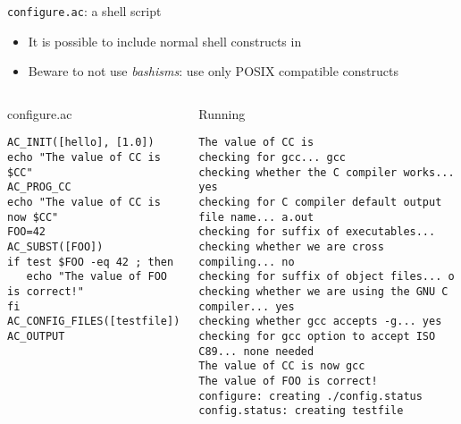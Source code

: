 \begin{frame}[fragile]{{\tt configure.ac}: a shell script}

\begin{itemize}
\item It is possible to include normal shell constructs in
\item Beware to not use {\em bashisms}: use only POSIX compatible
  constructs
\end{itemize}

\begin{columns}

\begin{block}{configure.ac}
{\tiny
\begin{verbatim}
AC_INIT([hello], [1.0])
echo "The value of CC is $CC"
AC_PROG_CC
echo "The value of CC is now $CC"
FOO=42
AC_SUBST([FOO])
if test $FOO -eq 42 ; then
   echo "The value of FOO is correct!"
fi
AC_CONFIG_FILES([testfile])
AC_OUTPUT
\end{verbatim}}
\end{block}


\begin{block}{Running }
\begin{verbatim}
The value of CC is 
checking for gcc... gcc
checking whether the C compiler works... yes
checking for C compiler default output file name... a.out
checking for suffix of executables... 
checking whether we are cross compiling... no
checking for suffix of object files... o
checking whether we are using the GNU C compiler... yes
checking whether gcc accepts -g... yes
checking for gcc option to accept ISO C89... none needed
The value of CC is now gcc
The value of FOO is correct!
configure: creating ./config.status
config.status: creating testfile
\end{verbatim}
\end{block}

\end{columns}

\end{frame}

